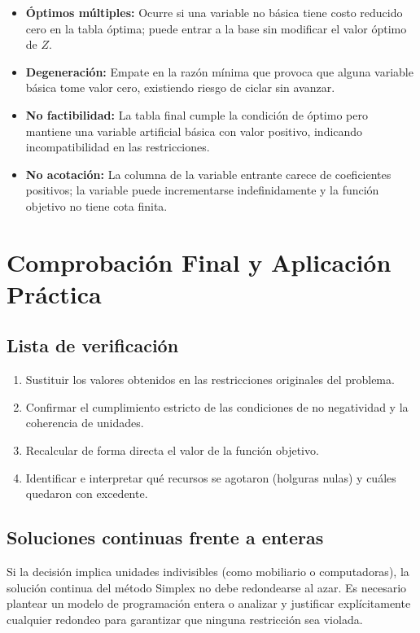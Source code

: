 \documentclass[11pt, a4paper]{article}
\begin{document}
\begin{itemize}
    \item \textbf{Óptimos múltiples:} Ocurre si una variable no básica tiene costo reducido cero en la tabla óptima; puede entrar a la base sin modificar el valor óptimo de $Z$.
    \item \textbf{Degeneración:} Empate en la razón mínima que provoca que alguna variable básica tome valor cero, existiendo riesgo de ciclar sin avanzar.
    \item \textbf{No factibilidad:} La tabla final cumple la condición de óptimo pero mantiene una variable artificial básica con valor positivo, indicando incompatibilidad en las restricciones.
    \item \textbf{No acotación:} La columna de la variable entrante carece de coeficientes positivos; la variable puede incrementarse indefinidamente y la función objetivo no tiene cota finita.
\end{itemize}

\section{Comprobación Final y Aplicación Práctica}

\subsection*{Lista de verificación}
\begin{enumerate}
    \item Sustituir los valores obtenidos en las restricciones originales del problema.
    \item Confirmar el cumplimiento estricto de las condiciones de no negatividad y la coherencia de unidades.
    \item Recalcular de forma directa el valor de la función objetivo.
    \item Identificar e interpretar qué recursos se agotaron (holguras nulas) y cuáles quedaron con excedente.
\end{enumerate}

\subsection*{Soluciones continuas frente a enteras}
Si la decisión implica unidades indivisibles (como mobiliario o computadoras), la solución continua del método Simplex no debe redondearse al azar. Es necesario plantear un modelo de programación entera o analizar y justificar explícitamente cualquier redondeo para garantizar que ninguna restricción sea violada.
\end{document}
